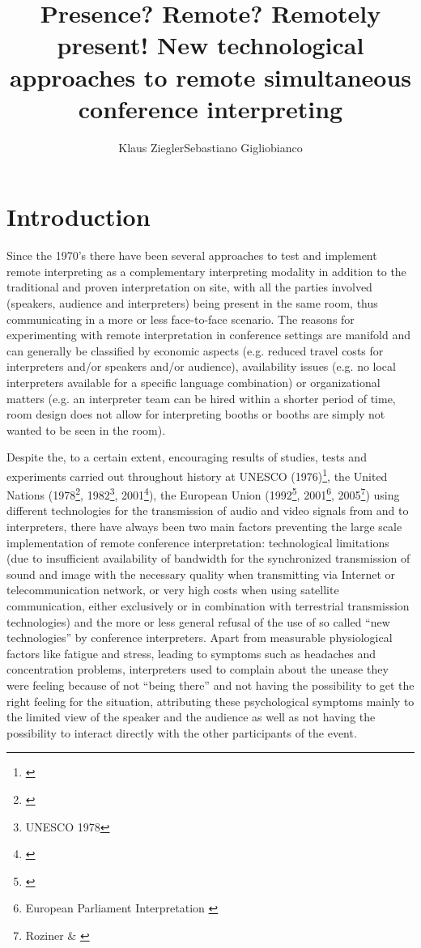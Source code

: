 \documentclass[output=paper]{langsci/langscibook}
\author{Klaus Ziegler\affiliation{affiliation}\lastand Sebastiano Gigliobianco\affiliation{affiliation}}
\title{Presence? Remote? Remotely present! New technological approaches to remote simultaneous conference interpreting}
\begin{document}
\section{Introduction}
Since the 1970’s there have been several approaches to test and implement remote interpreting as a complementary interpreting modality in addition to the traditional and proven interpretation on site, with all the parties involved (speakers, audience and interpreters) being present in the same room, thus communicating in a more or less face-to-face scenario. The reasons for experimenting with remote interpretation in conference settings are manifold and can generally be classified by economic aspects (e.g. reduced travel costs for interpreters and/or speakers and/or audience), availability issues (e.g. no local interpreters available for a specific language combination) or organizational matters (e.g. an interpreter team can be hired within a shorter period of time, room design does not allow for interpreting booths or booths are simply not wanted to be seen in the room). 

Despite the, to a certain extent, encouraging results of studies, tests and experiments carried out throughout history at UNESCO (1976)\footnote{\citealt{Kurz2000}}, the United Nations (1978\footnote{\citealt{Chernov2000}}, 1982\footnote{UNESCO 1978}, 2001\footnote{\citealt{Mouzourakis2006}}), the European Union (1992\footnote{\citealt{Kurz2000}}, 2001\footnote{European Parliament Interpretation \citealt{Directorate2001}}, 2005\footnote{Roziner \& \citealt{Shlesinger2010}}) using different technologies for the transmission of audio and video signals from and to interpreters, there have always been two main factors preventing the large scale implementation of remote conference interpretation: technological limitations (due to insufficient availability of bandwidth for the synchronized transmission of sound and image with the necessary quality when transmitting via Internet or telecommunication network, or very high costs when using satellite communication, either exclusively or in combination with terrestrial transmission technologies) and the more or less general refusal of the use of so called “new technologies” by conference interpreters. Apart from measurable physiological factors like fatigue and stress, leading to symptoms such as headaches and concentration problems, interpreters used to complain about the unease they were feeling because of not “being there” \citep{Mouzourakis2003} and not having the possibility to get the right feeling for the situation, attributing these psychological symptoms mainly to the limited view of the speaker and the audience as well as not having the possibility to interact directly with the other participants of the event.
\end{document}
